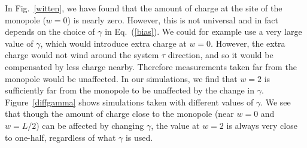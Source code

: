\documentclass[prb,twocolumn]{revtex4-1}
\newcommand{\scripty}[1]{w}
\begin{document}
In Fig.~\ref{witten}, we have found that the amount of charge at the site of the monopole ($\scripty{r}=0$) is nearly zero. However, this is not universal and in fact depends on the choice of $\gamma$ in Eq.~(\ref{bias}). We could for example use a very large value of $\gamma$, which would introduce extra charge at $\scripty{r}=0$. However, the extra charge would not wind around the system $\tau$ direction, and so it would be compensated by less charge nearby. Therefore measurements taken far from the monopole would be unaffected. In our simulations, we find that $\scripty{r}=2$ is sufficiently far from the monopole to be unaffected by the change in $\gamma$. Figure~\ref{diffgamma} shows simulations taken with different values of $\gamma$. We see that though the amount of charge close to the monopole (near $\scripty{r}=0$ and $\scripty{r}=L/2$) can be affected by changing $\gamma$, the value at $\scripty{r}=2$ is always very close to one-half, regardless of what $\gamma$ is used.
\end{document}
